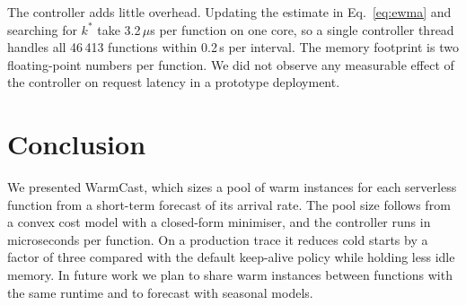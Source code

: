 \documentclass[10pt]{article}
\begin{document}
The controller adds little overhead. Updating the estimate in
Eq.~\eqref{eq:ewma} and searching for $k^{*}$ take 3.2\,$\mu$s per function
on one core, so a single controller thread handles all 46\,413 functions
within 0.2\,s per interval. The memory footprint is two floating-point numbers
per function. We did not observe any measurable effect of the controller on
request latency in a prototype deployment.

\section{Conclusion}
\label{sec:conclusion}

We presented WarmCast, which sizes a pool of warm instances for each
serverless function from a short-term forecast of its arrival rate. The pool
size follows from a convex cost model with a closed-form minimiser, and the
controller runs in microseconds per function. On a production trace it
reduces cold starts by a factor of three compared with the default keep-alive
policy while holding less idle memory. In future work we plan to share warm
instances between functions with the same runtime and to forecast with
seasonal models.
\end{document}
